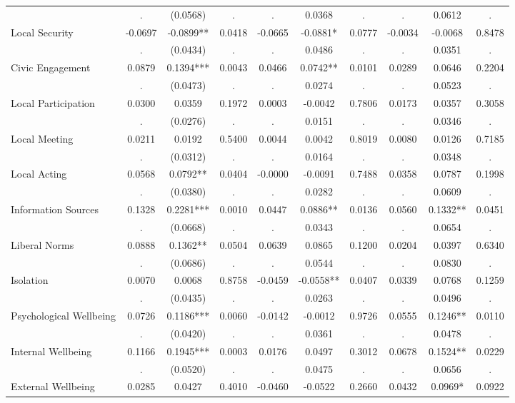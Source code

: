 \begin{tabular}{l*{9}{c}}
  & . & (0.0568) & . & . & 0.0368 & . & . & 0.0612 & . \\
Local Security & -0.0697 & -0.0899** & 0.0418 & -0.0665 & -0.0881* & 0.0777 & -0.0034 & -0.0068 & 0.8478 \\
  & . & (0.0434) & . & . & 0.0486 & . & . & 0.0351 & . \\
Civic Engagement & 0.0879 & 0.1394*** & 0.0043 & 0.0466 & 0.0742** & 0.0101 & 0.0289 & 0.0646 & 0.2204 \\
  & . & (0.0473) & . & . & 0.0274 & . & . & 0.0523 & . \\
Local Participation & 0.0300 & 0.0359 & 0.1972 & 0.0003 & -0.0042 & 0.7806 & 0.0173 & 0.0357 & 0.3058 \\
  & . & (0.0276) & . & . & 0.0151 & . & . & 0.0346 & . \\
Local Meeting & 0.0211 & 0.0192 & 0.5400 & 0.0044 & 0.0042 & 0.8019 & 0.0080 & 0.0126 & 0.7185 \\
  & . & (0.0312) & . & . & 0.0164 & . & . & 0.0348 & . \\
Local Acting & 0.0568 & 0.0792** & 0.0404 & -0.0000 & -0.0091 & 0.7488 & 0.0358 & 0.0787 & 0.1998 \\
  & . & (0.0380) & . & . & 0.0282 & . & . & 0.0609 & . \\
Information Sources & 0.1328 & 0.2281*** & 0.0010 & 0.0447 & 0.0886** & 0.0136 & 0.0560 & 0.1332** & 0.0451 \\
  & . & (0.0668) & . & . & 0.0343 & . & . & 0.0654 & . \\
Liberal Norms & 0.0888 & 0.1362** & 0.0504 & 0.0639 & 0.0865 & 0.1200 & 0.0204 & 0.0397 & 0.6340 \\
  & . & (0.0686) & . & . & 0.0544 & . & . & 0.0830 & . \\
Isolation & 0.0070 & 0.0068 & 0.8758 & -0.0459 & -0.0558** & 0.0407 & 0.0339 & 0.0768 & 0.1259 \\
  & . & (0.0435) & . & . & 0.0263 & . & . & 0.0496 & . \\
Psychological Wellbeing & 0.0726 & 0.1186*** & 0.0060 & -0.0142 & -0.0012 & 0.9726 & 0.0555 & 0.1246** & 0.0110 \\
  & . & (0.0420) & . & . & 0.0361 & . & . & 0.0478 & . \\
Internal Wellbeing & 0.1166 & 0.1945*** & 0.0003 & 0.0176 & 0.0497 & 0.3012 & 0.0678 & 0.1524** & 0.0229 \\
  & . & (0.0520) & . & . & 0.0475 & . & . & 0.0656 & . \\
External Wellbeing & 0.0285 & 0.0427 & 0.4010 & -0.0460 & -0.0522 & 0.2660 & 0.0432 & 0.0969* & 0.0922 \\

\end{tabular}
